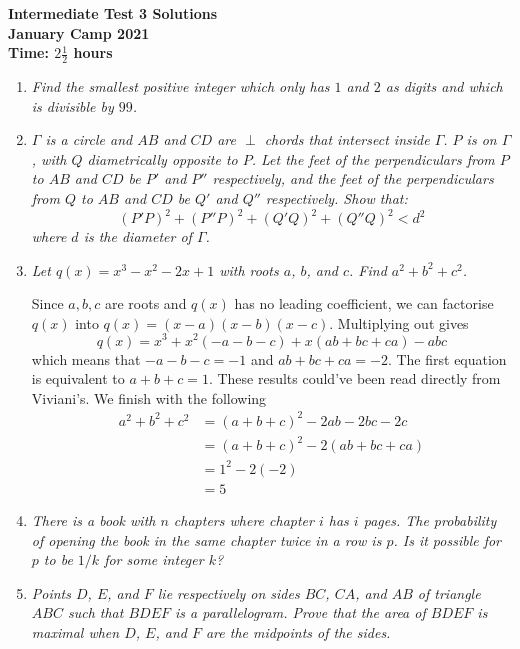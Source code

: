 \documentclass{article}
\begin{document}
\thispagestyle{empty}

\begin{center}
  \textbf{\Large Intermediate Test 3 Solutions}
  \\ \vspace{1em}
  \textbf{\large January Camp 2021}
  \\ \vspace{1em}
  \textbf{\large Time: $2\frac{1}{2}$ hours}
\end{center}

\vspace{24pt}

\begin{enumerate}[1.]

\item %
{\itshape Find the smallest positive integer which only has $1$ and $2$ as digits and which is divisible by $99$.}


\item %
{\itshape ${\Gamma}$ is a circle and ${AB}$ and ${CD}$ are ${\perp}$ chords that intersect inside ${\Gamma}$. ${P}$ is on ${\Gamma}$, with ${Q}$ diametrically opposite to ${P}$. Let the feet of the perpendiculars from ${P}$ to ${AB}$ and ${CD}$ be ${P'}$ and ${P''}$ respectively, and the feet of the perpendiculars from ${Q}$ to ${AB}$ and ${CD}$ be ${Q'}$ and ${Q''}$ respectively. Show that: $${ (P'P)^2+(P''P)^2+(Q'Q)^2+(Q''Q)^2 < d^2}$$ where ${d}$ is the diameter of ${\Gamma}$.}

\item %
{\itshape Let $q(x) = x^3 -x^2 -2x +1$ with roots $a$, $b$, and $c$.
Find $a^2 +b^2 + c^2$.}

Since $a,b,c$ are roots and $q(x)$ has no leading coefficient, we can factorise $q(x)$ into $q(x) = (x - a)(x - b)(x - c)$. Multiplying out gives $$q(x) = x^3 + x^2(-a - b - c) + x(ab + bc + ca) - abc$$ which means that $-a -b -c = -1$ and $ab + bc + ca = -2$. The first equation is equivalent to $a + b + c = 1$. These results could've been read directly from Viviani's. We finish with the following
\begin{align*}
a^2 + b^2 + c^2 &= (a + b + c)^2 - 2ab -2bc -2c\\
&= (a + b + c)^2 - 2(ab + bc + ca)\\
&= 1^2 -2(-2)\\
&= 5
\end{align*}


\item %
{\itshape There is a book with $n$ chapters where chapter $i$ has $i$ pages.
The probability of opening the book in the same chapter twice in a row is $p$.
Is it possible for $p$ to be $1/k$ for some integer $k$?}


\item %
{\itshape Points $D$, $E$, and $F$ lie respectively on sides $BC$, $CA$, and $AB$ of triangle $ABC$ such that $BDEF$ is a parallelogram. Prove that the area of $BDEF$ is maximal when $D$, $E$, and $F$ are the midpoints of the sides.}


\end{enumerate}
\end{document}
